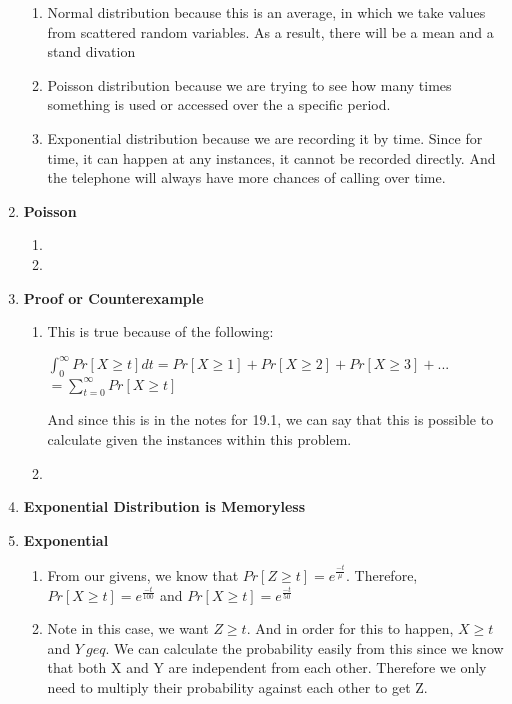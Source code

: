 \documentclass[12pt,fleqn]{article}
\begin{document}
\begin{enumerate}
\begin{enumerate}
	  \item 
	  	Normal distribution because this is an average, in which we take values from scattered random variables. As a result, there will be a mean and a stand divation
      \item 
      	Poisson distribution because we are trying to see how many times something is used or accessed over the a specific period.  
      \item 
      	Exponential distribution because we are recording it by time. Since for time, it can happen at any instances, it cannot be recorded directly. And the telephone will always have more chances of calling over time.
    \end{enumerate}
    
  
  \newpage
  \item \textbf{Poisson}
	\begin{enumerate}
		\item
			
		\item
	\end{enumerate}
	
  \newpage
  \item \textbf{Proof or Counterexample}
  	\begin{enumerate}
  		\item This is true because of the following:
  		
  			$\int_0^{\infty}Pr[X \geq t]dt = Pr[X \geq 1] + Pr[X \geq 2] + Pr[X \geq 3] + ...$  			
  			$ = \sum_{t=0}^{\infty}Pr[X \geq t]$
  			
  			And since this is in the notes for 19.1, we can say that this is possible to calculate given the instances within this problem. 
  		\item 
  	\end{enumerate}
  	
  	
  \newpage
  \item \textbf{Exponential Distribution is Memoryless}
  
  \newpage
  \item \textbf{Exponential}
  \begin{enumerate}
  	\item From our givens, we know that $Pr[Z \geq t] = e^{\frac{-t}{\mu}}$. Therefore, $Pr[ X \geq t] = e^{\frac{-t}{100}}$ and $Pr[ X \geq t] = e^{\frac{-t}{50}}$
  	\item Note in this case, we want $Z \geq t$. And in order for this to happen, $X \geq t$ and $Y \ geq$. We can calculate the probability easily from this since we know that both X and Y are independent from each other. Therefore we only need to multiply their probability against each other to get Z.
  	

\end{enumerate}
\end{enumerate}
\end{document}
